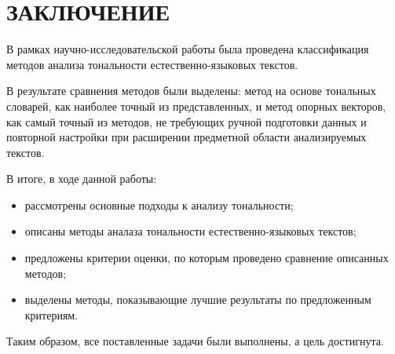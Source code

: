 \chapter*{ЗАКЛЮЧЕНИЕ}

В рамках научно-исследовательской работы была проведена классификация методов
анализа тональности естественно-языковых текстов.

В результате сравнения методов были выделены: метод на основе тональных
словарей, как наиболее точный из представленных, и метод опорных векторов, как
самый точный из методов, не требующих ручной подготовки данных и повторной
настройки при расширении предметной области анализируемых текстов.

В итоге, в ходе данной работы:
\begin{itemize}
    \item рассмотрены основные подходы к анализу тональности;
    \item описаны методы аналаза тональности естественно-языковых текстов;
    \item предложены критерии оценки, по которым проведено сравнение
        описанных методов;
    \item выделены методы, показывающие лучшие результаты по предложенным
        критериям.
\end{itemize}

Таким образом, все поставленные задачи были выполнены, а цель достигнута.
